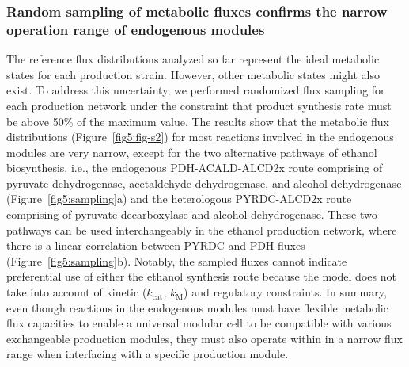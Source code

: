 
\subsubsection{Random sampling of metabolic fluxes confirms the narrow operation range of endogenous modules}
The reference flux distributions analyzed so far represent the ideal metabolic states for each production strain. However, other metabolic states might also exist.
To address this uncertainty, we performed randomized flux sampling \citep{kaufman1998, heirendt2017} for each production network under the constraint that product synthesis rate must be above 50\% of the maximum value.
The results show that the metabolic flux distributions (Figure~\ref{fig5:fig-s2}) for most reactions involved in the endogenous modules are very narrow, except for the two alternative pathways of ethanol biosynthesis, i.e., the endogenous PDH-ACALD-ALCD2x route comprising of pyruvate dehydrogenase, acetaldehyde dehydrogenase, and alcohol dehydrogenase (Figure~\ref{fig5:sampling}a) and the heterologous PYRDC-ALCD2x route comprising of pyruvate decarboxylase and alcohol dehydrogenase. These two pathways can be used interchangeably in the ethanol production network, where there is a linear correlation between PYRDC and PDH fluxes (Figure~\ref{fig5:sampling}b). Notably, the sampled fluxes cannot indicate preferential use of either the ethanol synthesis route because the model does not take into account of kinetic ($k_{\textrm{cat}}$, $k_\textrm{M}$) and regulatory constraints.
In summary, even though reactions in the endogenous modules must have flexible metabolic flux capacities to enable a universal modular cell to be compatible with various exchangeable production modules, they must also operate within in a narrow flux range when interfacing with a specific production module.

